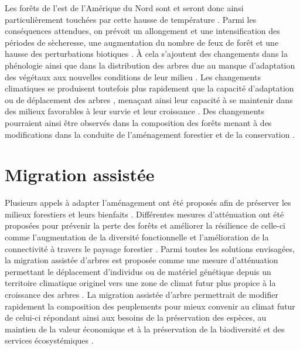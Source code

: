 Les forêts de l'est de l'Amérique du Nord sont et seront donc ainsi particulièrement touchées par cette hausse de température \citep{Park2014Canboreal,Mahony2017closerlook,Messier2022Warningnatural,Sittaro2017Treerange}.
Parmi les conséquences attendues, on prévoit un allongement et une intensification des périodes de sècheresse, une augmentation du nombre de feux de forêt et une hausse des perturbations biotiques \citep{Gatti2021Amazoniacarbon,Heidari2021Effectsclimate,Joyce2013Climatechange,Parmesan2007Influencesspecies}. 
À cela s'ajoutent des changements dans la phénologie \citep{Chuine2010Whydoes} ainsi que dans la distribution des arbres \citep{Gray2013Trackingsuitable,Zhu2012Failuremigrate} due au manque d'adaptation des végétaux aux nouvelles conditions de leur milieu \citep{Aitken2008Adaptationmigration}.
Les changements climatiques se produisent toutefois plus rapidement que la capacité d'adaptation ou de déplacement des arbres \citep{Aitken2008Adaptationmigration,Harrison2020Plantcommunity,Loarie2009velocityclimate,Messier2022Warningnatural,Williams2013Preparingclimate,Vitt2010Assistedmigration}, 
menaçant ainsi leur capacité à se maintenir dans des milieux favorables à leur survie et leur croissance \citep{Sittaro2017Treerange,Woodall2018Decadalchanges,Zhu2012Failuremigrate}.
Des changements pourraient ainsi être observés dans la composition des forêts menant à des modifications dans la conduite de l'aménagement forestier et de la conservation \citep{Chmura2011Forestresponses,Lo2011Linkingclimate,McKenney2009Climatechange}.


\section*{Migration assistée}
\label{sec:fam}

Plusieurs appels à adapter l'aménagement ont été proposés afin de préserver les milieux forestiers et leurs bienfaits \citep{Messier2021sakeresilience,Nagel2017Adaptivesilviculture}.
Différentes mesures d'atténuation ont été proposées pour prévenir la perte des forêts et améliorer la résilience de celle-ci comme l'augmentation de la diversité fonctionnelle et l'amélioration de la connectivité à travers le paysage forestier \citep{Messier2019functionalcomplex}.
Parmi toutes les solutions envisagées, la migration assistée d'arbres est proposée comme une mesure d'atténuation permettant le déplacement d'individus ou de matériel génétique depuis un territoire climatique originel vers une zone de climat futur plus propice à la croissance des arbres \citep{Dumroese2015Considerationsrestoring,Palik2022Operationalizingforestassisted,Park2023Provenancetrials,Park2018Informationunderload,Pedlar2011implementationassisted,Vitt2010Assistedmigration,Williams2013Preparingclimate}. 
La migration assistée d'arbre permettrait de modifier rapidement la composition des peuplements pour mieux convenir au climat futur de celui-ci \citep{Pedlar2011implementationassisted} 
répondant ainsi aux besoins de la préservation des espèces, au maintien de la valeur économique et à la préservation de la biodiversité et des services écosystémiques \citep{Ste-Marie2011Assistedmigration,Winder2011Ecologicalimplications}.

